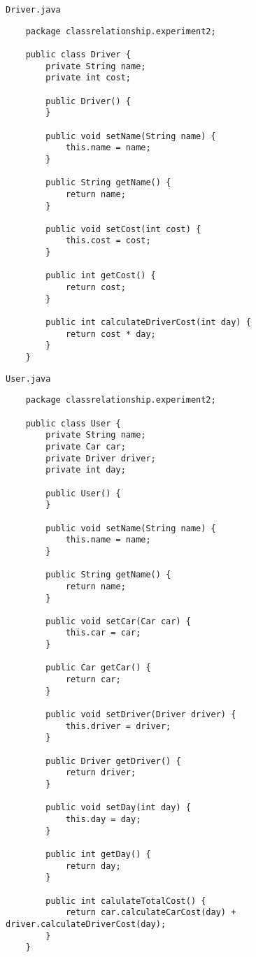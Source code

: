 \documentclass[12pt,titlepage]{article}
\begin{document}
\newpage
\noindent \texttt{Driver.java}
\begin{verbatim}
    package classrelationship.experiment2;

    public class Driver {
        private String name;
        private int cost;

        public Driver() {
        }

        public void setName(String name) {
            this.name = name;
        }

        public String getName() {
            return name;
        }

        public void setCost(int cost) {
            this.cost = cost;
        }

        public int getCost() {
            return cost;
        }

        public int calculateDriverCost(int day) {
            return cost * day;
        }
    }
\end{verbatim}

\newpage
\noindent \texttt{User.java}
\begin{verbatim}
    package classrelationship.experiment2;

    public class User {
        private String name;
        private Car car;
        private Driver driver;
        private int day;

        public User() {
        }

        public void setName(String name) {
            this.name = name;
        }

        public String getName() {
            return name;
        }

        public void setCar(Car car) {
            this.car = car;
        }

        public Car getCar() {
            return car;
        }

        public void setDriver(Driver driver) {
            this.driver = driver;
        }

        public Driver getDriver() {
            return driver;
        }

        public void setDay(int day) {
            this.day = day;
        }

        public int getDay() {
            return day;
        }

        public int calulateTotalCost() {
            return car.calculateCarCost(day) + driver.calculateDriverCost(day);
        }
    }
\end{verbatim}
\end{document}
